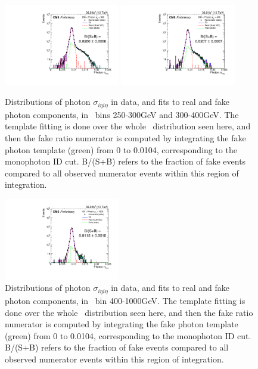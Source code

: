\begin{figure}[hbtp]
  \begin{center}
  \includegraphics[width=0.45\textwidth]{Figures/QCD/num_fit_250to300.pdf}
  \includegraphics[width=0.45\textwidth]{Figures/QCD/num_fit_300to400.pdf}
  \caption{Distributions of photon $\sigma_{i\eta i\eta}$ in data, and fits to real and fake photon components, in \ETgamma\ bins 250-300\unit{GeV} and 300-400\unit{GeV}.
  The template fitting is done over the whole \sieie\ distribution seen here, and then the fake ratio numerator is computed by integrating the fake photon template (green)
  from 0 to 0.0104, corresponding to the monophoton ID cut. B/(S+B) refers to the fraction of fake events compared to all observed numerator events within this region of integration.}
  \label{fig:qcd_fits_b}
  \end{center}
\end{figure}

\begin{figure}[hbtp]
  \begin{center}
  \includegraphics[width=0.45\textwidth]{Figures/QCD/num_fit_400to1000.pdf}
  \caption{Distributions of photon $\sigma_{i\eta i\eta}$ in data, and fits to real and fake photon components, in \ETgamma\ bin 400-1000\unit{GeV}.
  The template fitting is done over the whole \sieie\ distribution seen here, and then the fake ratio numerator is computed by integrating the fake photon template (green)
  from 0 to 0.0104, corresponding to the monophoton ID cut. B/(S+B) refers to the fraction of fake events compared to all observed numerator events within this region of integration.}
  \label{fig:qcd_fits_c}
  \end{center}
\end{figure}

